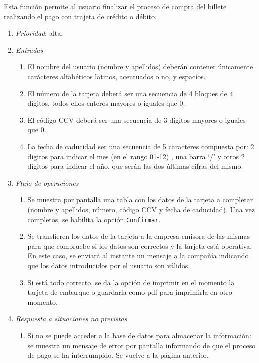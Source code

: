

 \label{fun:pagotarjeta}
	Esta función permite al usuario finalizar el proceso de compra del billete realizando el pago con trajeta de crédito o débito.

\begin{enumerate}
	\item \textit{Prioridad}: alta.
	\item \textit{Entradas}
	\begin{enumerate}
		\item El nombre del usuario (nombre y apellidos) deberán contener únicamente carácteres alfabéticos latinos, acentuados o no, y espacios.
		\item El número de la tarjeta deberá ser una secuencia de 4 bloques de 4 dígitos, todos ellos enteros mayores o iguales que 0.
		\item El código CCV deberá ser una secuencia de 3 dígitos mayores o iguales que 0.
		\item La fecha de caducidad  ser una secuencia de 5 caracteres compuesta por: 2 dígitos para indicar el mes (en el rango 01-12) , una barra `/'  y otros 2 dígitos para indicar el año, que serán las dos últimas cifras del mismo.
	\end{enumerate}
	\item \textit{Flujo de operaciones}
	\begin{enumerate}
		\item Se muestra por pantalla una tabla con los datos de la tarjeta a completar (nombre y apellidos, número, código CCV y fecha de caducidad). Una vez completos, se habilita la opción \verb|Confirmar|.
		\item Se transfieren los datos de la tarjeta a la empresa emisora de las mismas para que compruebe si los datos son correctos y la tarjeta está operativa. En este caso, se enviará al instante un mensaje a la compañía indicando que los datos introducidos por el usuario son válidos.
		\item Si está todo correcto, se da la opción de imprimir en el momento la tarjeta de embarque o guardarla como pdf para imprimirla en otro momento.
	\end{enumerate}
	\item \textit{Respuesta a situaciones no previstas}
	\begin{enumerate}
		\item Si no se puede acceder a la base de datos para almacenar la información: se muestra un mensaje de error por pantalla informando de que el proceso de pago se ha interrumpido. Se vuelve a la página anterior.

\end{enumerate}
\end{enumerate}
